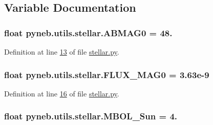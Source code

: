 \subsection{Variable Documentation}
\hypertarget{namespacepyneb_1_1utils_1_1stellar_a54ebf26e2af1a957afac5ce6db64de30}{
\subsubsection[{A\-B\-M\-A\-G0}]{\setlength{\rightskip}{0pt plus 5cm}float pyneb.\-utils.\-stellar.\-A\-B\-M\-A\-G0 = 48.}}\label{namespacepyneb_1_1utils_1_1stellar_a54ebf26e2af1a957afac5ce6db64de30}


Definition at line \hyperlink{stellar_8py_source_l00013}{13} of file \hyperlink{stellar_8py_source}{stellar.\-py}.

\hypertarget{namespacepyneb_1_1utils_1_1stellar_ab52d6f24f3c66cb2d6ad7e52bd4b4cd6}{
\subsubsection[{F\-L\-U\-X\-\_\-\-M\-A\-G0}]{\setlength{\rightskip}{0pt plus 5cm}float pyneb.\-utils.\-stellar.\-F\-L\-U\-X\-\_\-\-M\-A\-G0 = 3.\-63e-\/9}}\label{namespacepyneb_1_1utils_1_1stellar_ab52d6f24f3c66cb2d6ad7e52bd4b4cd6}


Definition at line \hyperlink{stellar_8py_source_l00016}{16} of file \hyperlink{stellar_8py_source}{stellar.\-py}.

\hypertarget{namespacepyneb_1_1utils_1_1stellar_ab677115958b6555a42963ed87adc1afc}{
\subsubsection[{M\-B\-O\-L\-\_\-\-Sun}]{\setlength{\rightskip}{0pt plus 5cm}float pyneb.\-utils.\-stellar.\-M\-B\-O\-L\-\_\-\-Sun = 4.}}\label{namespacepyneb_1_1utils_1_1stellar_ab677115958b6555a42963ed87adc1afc}



